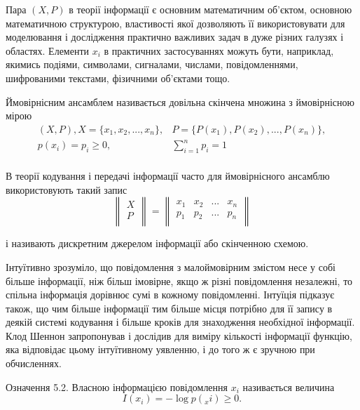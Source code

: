 Пара $(X, P)$ в теорії інформації є основним математичним об’єктом,
основною математичною структурою, властивості якої дозволяють її
використовувати для моделювання і дослідження практично важливих задач
в дуже різних галузях і областях. Елементи $x_i$ в практичних застосуваннях
можуть бути, наприклад, якимись подіями, символами, сигналами, числами,
повідомленнями, шифрованими текстами, фізичними об’єктами тощо.

\begin{definition}
    Ймовірнісним ансамблем називається довільна скінчена
    множина з ймовірнісною мірою
    \begin{equation}
        \begin{split}
            (X, P), X = \{x_1, x_2, ..., x_n\}, & P = \{P(x_1), P(x_2), ..., P(x_n)\}, \\
            p(x_i) = p_i \geqslant 0, & \sum\limits_{i=1}^{n} p_i = 1 \\
        \end{split}
    \end{equation}
\end{definition}

В теорії кодування і передачі інформації часто для ймовірнісного ансамблю
використовують такий запис
$$\begin{Vmatrix}
    X \\
    P \\
\end{Vmatrix}
= \begin{Vmatrix}
    x_1 & x_2 & ... & x_n \\
    p_1 & p_2 & ... & p_n \\
\end{Vmatrix}$$

і називають дискретним джерелом інформації або скінченною схемою.

Інтуїтивно зрозуміло, що повідомлення з малоймовірним змістом несе
у собі більше інформації, ніж більш імовірне, якщо ж різні повідомлення
незалежні, то спільна інформація дорівнює сумі в кожному повідомленні.
Інтуїція підказує також, що чим більше інформації тим більше місця
потрібно для її запису в деякій системі кодування і більше кроків для 
знаходження необхідної інформації. Клод Шеннон запропонував і дослідив
для виміру кількості інформації функцію, яка відповідає цьому інтуїтивному
уявленню, і до того ж є зручною при обчисленнях.

Означення 5.2. Власною інформацією повідомлення $x_i$ називається
величина
$$I(x_i) = -\log p(_xi) \geqslant 0.$$

